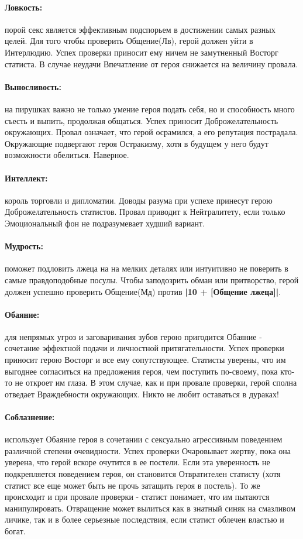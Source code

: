 \paragraph{Ловкость:} порой секс является эффективным подспорьем в достижении самых разных целей.
\newline Для того чтобы проверить Общение(Лв), герой должен уйти в Интерлюдию. Успех проверки приносит ему ничем не замутненный Восторг статиста. В случае неудачи Впечатление от героя снижается на величину провала.
\paragraph{Выносливость:} на пирушках важно не только умение героя подать себя, но и способность много съесть и выпить, продолжая общаться. Успех приносит Доброжелательность окружающих. Провал означает, что герой осрамился, а его репутация пострадала. Окружающие подвергают героя Остракизму, хотя в будущем у него будут возможности обелиться. Наверное.
\paragraph{Интеллект:} король торговли и дипломатии. Доводы разума при успехе принесут герою Доброжелательность статистов. Провал приводит к Нейтралитету, если только Эмоциональный фон не подразумевает худший вариант.
\paragraph{Мудрость:} поможет подловить лжеца на на мелких деталях или интуитивно не поверить в самые правдоподобные посулы. Чтобы заподозрить обман или притворство, герой должен успешно проверить Общение(Мд) против \textbf{|10 + [Общение лжеца]|}. 
\paragraph{Обаяние:} для непрямых угроз и заговаривания зубов герою пригодится Обаяние - сочетание эффектной подачи и личностной притягательности. 
\newline Успех проверки приносит герою Восторг и все ему сопутствующее. Статисты уверены, что им выгоднее согласиться на предложения героя, чем поступить по-своему, пока кто-то не откроет им глаза. В этом случае, как и при провале проверки, герой сполна отведает Враждебности окружающих. Никто не любит оставаться в дураках!
\paragraph{Соблазнение:} использует Обаяние героя в сочетании с сексуально агрессивным поведением различной степени очевидности. 
\newline Успех проверки Очаровывает жертву, пока она уверена, что герой вскоре очутится в ее постели. Если эта уверенность не подкрепляется поведением героя, он становится Отвратителен статисту (хотя статист все еще может быть не прочь затащить героя в постель). То же происходит и при провале проверки - статист понимает, что им пытаются манипулировать. Отвращение может вылиться как в знатный синяк на смазливом личике, так и в более серьезные последствия, если статист облечен властью и богат. 
